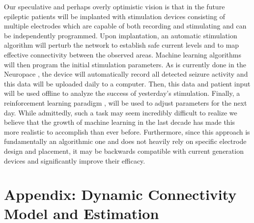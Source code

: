 \documentclass[11pt,a4paper,final]{article}
\begin{document}
Our speculative and perhaps overly optimistic vision is that in the future epileptic patients will be implanted with stimulation devices consisting of multiple electrodes which are capable of both recording and stimulating \citep{ryapolova14} and can be independently programmed.
Upon implantation, an automatic stimulation algorithm will perturb the network to establish safe current levels and to map effective connectivity between the observed areas.
Machine learning algorithms will then program the initial stimulation parameters.
As is currently done in the Neuropace \citep{NP}, the device will automatically record all detected seizure activity and this data will be uploaded daily to a computer.
Then, this data and patient input will be used offline to analyze the success of yesterday's stimulation.
Finally, a reinforcement learning paradigm \citep{gosavi14}, will be used to adjust parameters for the next day.
While admittedly, such a task may seem incredibly difficult to realize we believe that the growth of machine learning in the last decade has made this more realistic to accomplish than ever before.
Furthermore, since this approach is fundamentally an algorithmic one and does not heavily rely on specific electrode design and placement, it may be backwards compatible with current generation devices and significantly improve their efficacy.  

\section*{Appendix: Dynamic Connectivity Model and Estimation}
\end{document}

